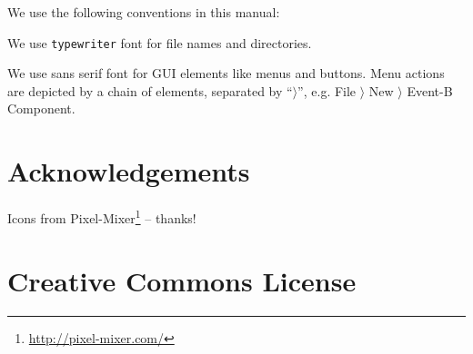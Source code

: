 \documentclass{book}
\begin{document}
We use the following conventions in this manual:


We use \texttt{typewriter} font for file names and directories.

We use \textsf{sans serif font} for GUI elements like menus and buttons.  Menu actions are depicted by a chain of elements, separated by ``$\rangle$'', e.g. \textsf{File $\rangle$ New $\rangle$ Event-B Component}.

\section{Acknowledgements}

Icons from Pixel-Mixer\footnote{\url{http://pixel-mixer.com/}} -- thanks!

\section{Creative Commons License}








\end{document}
